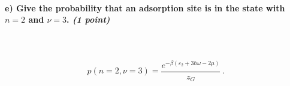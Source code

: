 \paragraph{e) Give the probability that an adsorption site is in the 
    state with $n=2$ and $\nu=3$. \textit{(1 point)}
} \ \\
\\
    \begin{equation}
	p(n=2,\nu=3)
        =\frac{e^{-\beta(\varepsilon_2+3\hbar\omega-2\mu)}}{z_G} \,.
    \end{equation}
